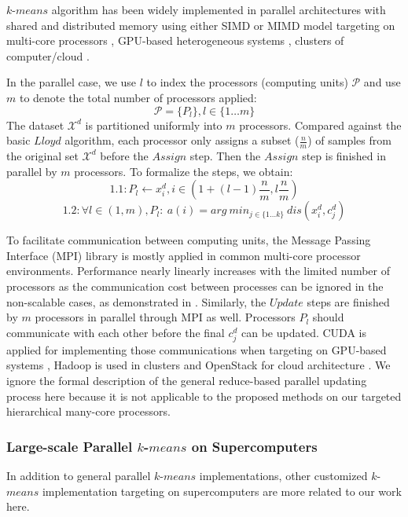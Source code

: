 $k$-$means$ algorithm has been widely implemented in parallel architectures with shared and distributed memory using either SIMD or MIMD model targeting on multi-core processors \cite{dhillon2002data,hadian2014high,bohm2017multi}, GPU-based heterogeneous systems \cite{zechner2009accelerating,li2010speeding,torok2017k}, clusters of computer/cloud \cite{cui2014optimized,haut2017cloud}. 

In the parallel case, we use $l$ to index the processors (computing units) $\mathcal{P}$ and use $m$ to denote the total number of processors applied: $$\mathcal{P} = \{P_l\}, l \in \{1 \ldots m\}$$ The dataset $\mathcal{X}^d$ is partitioned uniformly into $m$ processors. Compared against the basic $Lloyd$ algorithm, each processor only assigns a subset ($\frac{n}{m}$) of samples from the original set $\mathcal{X}^d$ before  the $Assign$ step. Then the $Assign$ step is finished in parallel by $m$ processors. To formalize the steps, we obtain:
$$1.1: P_l \leftarrow {x^d_i}, i \in (1+(l-1)\frac{n}{m},l\frac{n}{m})  $$
$$1.2:\forall l \in (1,m), P_l:\ a(i) = arg\ min_{j\in \{1 \ldots k \} }\ dis({x^d_i}, c^d_j) $$ 

To facilitate communication between computing units, the Message Passing Interface (MPI) library is mostly applied in common multi-core processor environments. Performance nearly linearly increases with the limited number of processors as the communication cost between processes can be ignored in the non-scalable cases, as demonstrated in \cite{dhillon2002data}. Similarly, the $Update$ steps are finished by $m$ processors in parallel through MPI as well. Processors $P_l$ should communicate with each other before the final $c^d_j$ can be updated. CUDA is applied for implementing those communications when targeting on GPU-based systems \cite{zechner2009accelerating}, Hadoop is used in clusters \cite{cui2014optimized} and OpenStack for cloud architecture \cite{haut2017cloud}. We ignore the formal description of the general reduce-based parallel updating process here because it is not applicable to the proposed methods on our targeted hierarchical many-core processors. 

\subsubsection{Large-scale Parallel $k$-$means$ on Supercomputers}
In addition to general parallel $k$-$means$ implementations, other customized $k$-$means$ implementation targeting on supercomputers are more related to our work here. 

